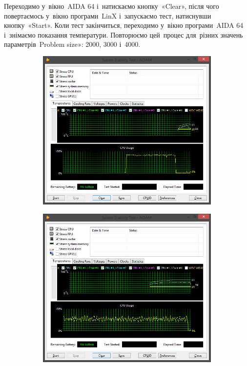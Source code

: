 \documentclass[
	a4paper,
	oneside,
	BCOR = 10mm,
	DIV = 12,
	12pt,
	headings = normal,
]{scrartcl}
\begin{document}
				Переходимо у~вікно~\textenglish{AIDA 64} і~натискаємо кнопку~«\textenglish{Clear}», після чого повертаємось у~вікно програми~\textenglish{LinX} і~запускаємо тест, натиснувши кнопку~«\textenglish{Start}». Коли тест закінчиться, переходимо у~вікно програми~\textenglish{AIDA 64} і~знімаємо показання температури. Повторюємо цей~процес для~різних значень параметрів~\textenglish{Problem size}»: 2000, 3000 і~4000.

			\begin{figure}[!htbp]
				\centering
				\begin{subfigure}[t]{\columnwidth / 2}
					\includegraphics[height = 12\baselineskip]{./assets/y03s02-pcdiag-lab-03-p04-aida-res-ps1000.png}
					\caption{}
					\label{subfig:aida64-res-ps1000}
				\end{subfigure}%
				\begin{subfigure}[t]{\columnwidth / 2}
					\includegraphics[height = 12\baselineskip]{./assets/y03s02-pcdiag-lab-03-p05-aida-res-ps2000.png}

\end{subfigure}
\end{figure}
\end{document}
